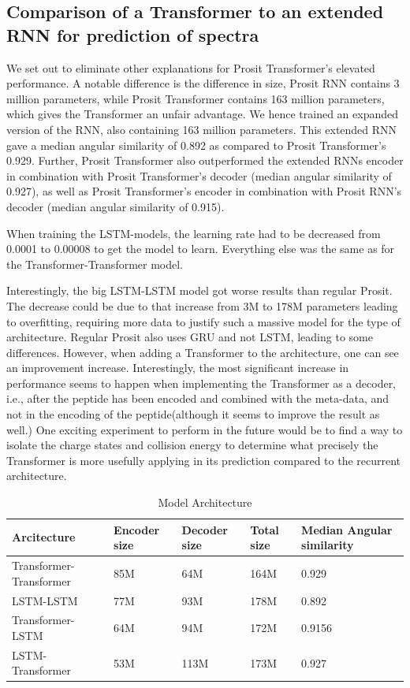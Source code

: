 \documentclass[10pt,a4paper]{article}
\begin{document}
\subsection*{Comparison of a Transformer to an extended RNN for prediction of spectra}

We set out to eliminate other explanations for Prosit Transformer's elevated performance. A notable difference is the difference in size, Prosit RNN contains 3 million parameters, while Prosit Transformer contains 163 million parameters, which gives the Transformer an unfair advantage. We hence trained an expanded version of the RNN, also containing 163 million parameters. This extended RNN gave a median angular similarity of 0.892  as compared to Prosit Transformer's 0.929. Further, Prosit Transformer also outperformed the extended RNNs encoder in combination with Prosit Transformer’s decoder (median angular similarity of 0.927), as well as Prosit Transformer's encoder in combination with Prosit RNN's decoder (median angular similarity of 0.915).

When training the LSTM-models, the learning rate had to be decreased from 0.0001 to 0.00008 to get the model to learn. Everything else was the same as for the Transformer-Transformer model.

Interestingly, the big LSTM-LSTM model got worse results than regular Prosit. The decrease could be due to that increase from 3M to 178M parameters leading to overfitting, requiring more data to justify such a massive model for the type of architecture. Regular Prosit also uses GRU and not LSTM, leading to some differences. However, when adding a Transformer to the architecture, one can see an improvement increase. Interestingly, the most significant increase in performance seems to happen when implementing the Transformer as a decoder, i.e., after the peptide has been encoded and combined with the meta-data, and not in the encoding of the peptide(although it seems to improve the result as well.) One exciting experiment to perform in the future would be to find a way to isolate the charge states and collision energy to determine what precisely the Transformer is more usefully applying in its prediction compared to the recurrent architecture.

\begin{table}[htbp]
    \centering
    \caption{Model Architecture}
      \begin{tabular}{l|llll}
      \toprule
      Arcitecture & Encoder size & Decoder size & Total size & Median Angular similarity \\
      \midrule
      Transformer-Transformer & 85M   & 64M   & 164M  & 0.929 \\
      LSTM-LSTM & 77M   & 93M   & 178M  & 0.892 \\
      Transformer-LSTM & 64M   & 94M   & 172M  & 0.9156 \\
      LSTM-Transformer & 53M   & 113M  & 173M  & 0.927 \\
      \end{tabular}%
    \label{tab:Architecture}%
  \end{table}%
\end{document}
